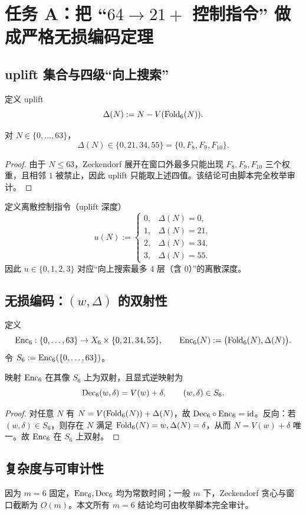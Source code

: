 \section{任务 A：把 ``$64\to 21+$ 控制指令'' 做成严格无损编码定理}\label{sec:lossless}

\subsection{uplift 集合与四级“向上搜索”}
定义 uplift
\[
  \Delta(N):=N - V(\mathrm{Fold}_6(N)).
\]

\begin{lemma}[uplift 四值]\label{lem:uplift-four}
对 $N\in\{0,\dots,63\}$，
\[
  \Delta(N)\in\{0,21,34,55\}=\{0,F_8,F_9,F_{10}\}.
\]
\end{lemma}
\begin{proof}
由于 $N\le 63$，Zeckendorf 展开在窗口外最多只能出现 $F_8,F_9,F_{10}$ 三个权重，且相邻 $1$ 被禁止，因此 uplift 只能取上述四值。该结论可由脚本完全枚举审计。
\end{proof}

定义离散控制指令（uplift 深度）
\[
  u(N):=
  \begin{cases}
    0,&\Delta(N)=0,\\
    1,&\Delta(N)=21,\\
    2,&\Delta(N)=34,\\
    3,&\Delta(N)=55.
  \end{cases}
\]
因此 $u\in\{0,1,2,3\}$ 对应“向上搜索最多 $4$ 层（含 $0$）”的离散深度。

\subsection{无损编码：$(w,\Delta)$ 的双射性}
定义
\[
  \mathrm{Enc}_6:\{0,\dots,63\}\to X_6\times \{0,21,34,55\},\qquad
  \mathrm{Enc}_6(N):=\bigl(\mathrm{Fold}_6(N),\Delta(N)\bigr).
\]
令 $S_6:=\mathrm{Enc}_6(\{0,\dots,63\})$。

\begin{theorem}[无损编码定理（$m=6$）]\label{thm:lossless}
映射 $\mathrm{Enc}_6$ 在其像 $S_6$ 上为双射，且显式逆映射为
\[
  \mathrm{Dec}_6(w,\delta)=V(w)+\delta,\qquad (w,\delta)\in S_6.
\]
\end{theorem}
\begin{proof}
对任意 $N$ 有 $N=V(\mathrm{Fold}_6(N))+\Delta(N)$，故 $\mathrm{Dec}_6\circ \mathrm{Enc}_6=\mathrm{id}$。反向：若 $(w,\delta)\in S_6$，则存在 $N$ 满足 $\mathrm{Fold}_6(N)=w,\Delta(N)=\delta$，从而 $N=V(w)+\delta$ 唯一。故 $\mathrm{Enc}_6$ 在 $S_6$ 上双射。
\end{proof}

\subsection{复杂度与可审计性}
因为 $m=6$ 固定，$\mathrm{Enc}_6,\mathrm{Dec}_6$ 均为常数时间；一般 $m$ 下，Zeckendorf 贪心与窗口截断为 $O(m)$。本文所有 $m=6$ 结论均可由枚举脚本完全审计。

